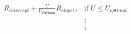 \documentclass[preview]{standalone}
\begin{document}
\begin{align*}
R_{intercept} +  \frac{U}{U_{Optimal}} R_{slope1}, & \text{if }  U \leq U_{optimal}  \\[6pt] & \text{i} \\ & \text{i}
\end{align*}
\end{document}

